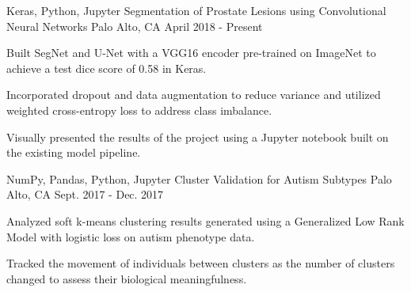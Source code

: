
\begin{cventries}
    
  \cventry
    {Keras, Python, Jupyter}
    {Segmentation of Prostate Lesions using Convolutional Neural Networks}
    {Palo Alto, CA}
    {April 2018 - Present}
    {
      \begin{cvitems}
        \item {Built SegNet and U-Net with a VGG16 encoder pre-trained on ImageNet to achieve a test dice score of 0.58 in Keras.}
        \item {Incorporated dropout and data augmentation to reduce variance and utilized weighted cross-entropy loss to address class imbalance.}
        \item {Visually presented the results of the project using a Jupyter notebook built on the existing model pipeline.}
      \end{cvitems} 
    }

  \cventry
    {NumPy, Pandas, Python, Jupyter}
    {Cluster Validation for Autism Subtypes}
    {Palo Alto, CA}
    {Sept. 2017 - Dec. 2017}
    {
      \begin{cvitems}
        \item {Analyzed soft k-means clustering results generated using a Generalized Low Rank Model with logistic loss on autism phenotype data.}
        \item {Tracked the movement of individuals between clusters as the number of clusters changed to assess their biological meaningfulness.}
      \end{cvitems}
    }
    
\end{cventries}
